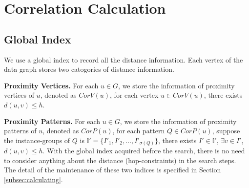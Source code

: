 \section{Correlation Calculation}
\label{sec:calculation}
\subsection{Global Index}
\label{subsec:global-index}

We use a global index to record all the distance information. Each vertex of the data graph stores two catogories of distance information.

\squishlist
\item{\bf Proximity Vertices.} For each $u\in G$, we store the information of proximity vertices of $u$, denoted as $CorV(u)$, for each vertex $u\in CorV(u)$, there exists $d(u,v)\le h$.
\squishend
\squishlist
\item{\bf Proximity Patterns.} For each $u\in G$, we store the information of proximity patterns of $u$, denoted as $CorP(u)$, for each pattern $Q\in CorP(u)$, suppose the instance-groups of $Q$ is $\mathbb{I'}=\{I'_1,I'_2,\ldots,I'_{\sigma(Q)}\}$, there exists $I'\in \mathbb{I'}$, $\exists v\in I'$, $d(u,v)\le h$.
\squishend
With the global index acquired before the search, there is no need to consider anything about the distance (hop-constraints) in the search steps. The detail of the maintenance of these two indices is specified in Section \ref{subsec:calculating}.

